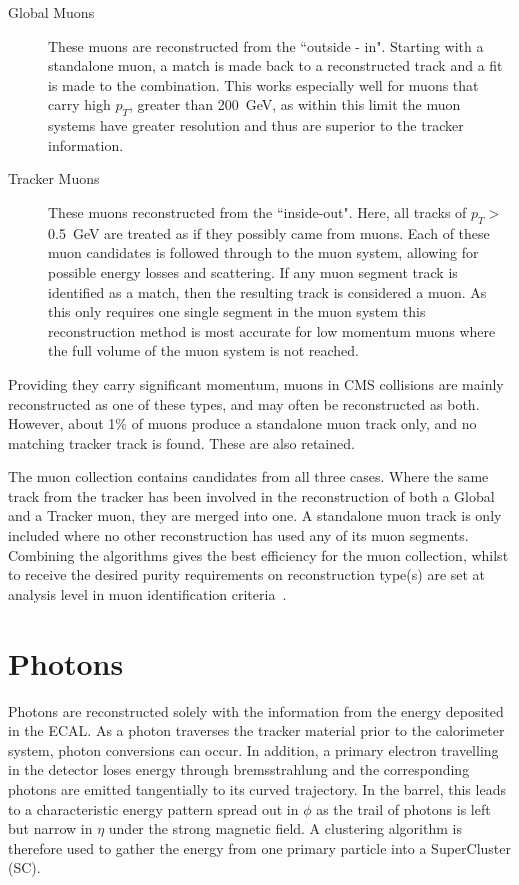 \begin{description}
\item[Global Muons]{These muons are reconstructed from the ``outside - in". Starting with a standalone muon, a match is made back to a reconstructed track and a fit is made to the combination. This works especially well for muons that carry high $p_{T}$, greater than 200~GeV, as within this limit the muon systems have greater resolution and thus are superior to the tracker information.}
\item[Tracker Muons]{These muons reconstructed from the ``inside-out". Here, all tracks of $p_{T} >$ 0.5~GeV are treated as if they possibly came from muons. Each of these muon candidates is followed through to the muon system, allowing for possible energy losses and scattering.  If any muon segment track is identified as a match, then the resulting track is considered a muon. As this only requires one single segment in the muon system this reconstruction method is most accurate for low momentum muons where the full volume of the muon system is not reached.}

\end{description}

Providing they carry significant momentum, muons in CMS collisions are mainly reconstructed as one of these types, and may often be reconstructed as both. However, about 1\% of muons produce a standalone muon track only, and no matching tracker track is found. These are also retained. 

The muon collection contains candidates from all three cases. Where the same track from the tracker has been involved in the reconstruction of both a Global and a Tracker muon, they are merged into one.  A standalone muon track is only included where no other reconstruction has used any of its muon segments. Combining the algorithms gives the best efficiency for the muon collection, whilst to receive the desired purity requirements on reconstruction type(s) are set at analysis level in muon identification criteria~\cite{MUO-10-004}. 

\section{Photons}

Photons are reconstructed solely with the information from the energy deposited in the ECAL. As a photon traverses the tracker material prior to the calorimeter system, photon conversions can occur.  In addition, a primary electron travelling in the detector loses energy through bremsstrahlung and the corresponding photons are emitted tangentially to its curved trajectory. In the barrel, this leads to a characteristic energy pattern spread out in $\phi$ as the trail of photons is left but narrow in $\eta$ under the strong magnetic field. A clustering algorithm is therefore used to gather the energy from one primary particle into a SuperCluster (SC).


